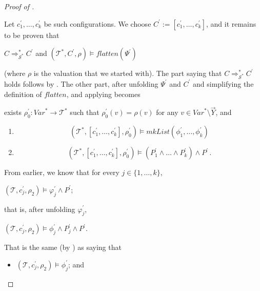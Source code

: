 \begin{proof}[Proof of ]
\begin{enumerate}
    Let $c_1^\prime,\ldots,c_k^\prime$ be such configurations.
    We choose $C^\prime := [ c_1^\prime,\ldots,c_k^\prime ]$,
    and it remains to be proven that
    \begin{proofenv}
        $C \Rightarrow^*_{\mathcal{S}^*} C^\prime$ and $(\mathcal{T}^*, C^\prime, \rho) \vDash \mathit{flatten}(\Psi^\prime)$ \,
    \end{proofenv}
    (where $\rho$ is the valuation that we started with).
    The part saying that $C \Rightarrow^*_{\mathcal{S}^*} C^\prime$ holds
    follows by . The other part,
    after unfolding $\Psi^\prime$ and $C^\prime$ and simplifying the definition of $\mathit{flatten}$,
    and applying 
    becomes
    \begin{proofenv}
    exists $\rho_0^\prime : \mathit{Var}^* \to \mathcal{T}^*$ such that $\rho_0^\prime(v) = \rho(v)$ for any $v \in \mathit{Var}^* \setminus \vec{Y}$, and
    \begin{enumerate}
        \item 
        \begin{equation*}
            (\mathcal{T}^*, [ c_1^\prime,\ldots,c_k^\prime ], \rho_0^\prime) \vDash \mathit{mkList}(\phi_1^\prime, \ldots, \phi_k^\prime)
        \end{equation*}
        \item 
        \begin{equation*}
            (\mathcal{T}^*, [ c_1^\prime,\ldots,c_k^\prime ], \rho_0^\prime) \vDash (P_1^\prime \land \ldots \land P_k^\prime) \land P^\prime \, .
        \end{equation*}
    \end{enumerate}
    \end{proofenv}
    From earlier, we know that for every $j \in \{ 1, \ldots, k \}$,
    \begin{proofenv}
    $(\mathcal{T}, c_j^\prime, \rho_2) \vDash \varphi^\prime_j \land P^\prime$;    
    \end{proofenv}
    that is, after unfolding $\varphi^\prime_j$,
    \begin{proofenv}
        $(\mathcal{T}, c_j^\prime, \rho_2) \vDash \phi^\prime_j \land P^\prime_j \land P^\prime$.
    \end{proofenv}
    That is the same (by ) as saying that
    \begin{proofenv}
        \begin{itemize}
            \item  $(\mathcal{T}, c_j^\prime, \rho_2) \vDash \phi^\prime_j$; and

\end{itemize}
\end{proofenv}
\end{enumerate}
\end{proof}
